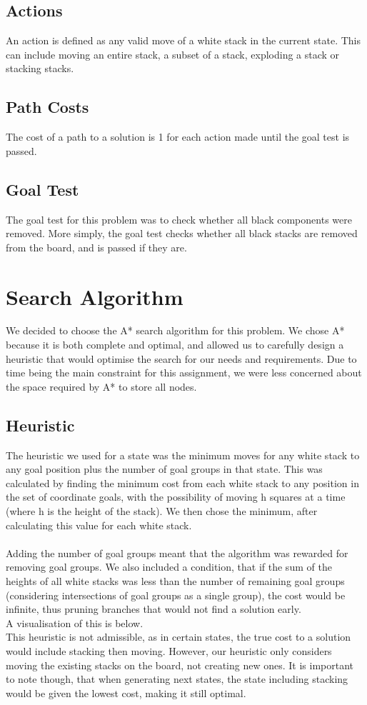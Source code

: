 \documentclass[11pt]{article}
\begin{document}
    \subsection{Actions}\label{subsec:actions}
    An action is defined as any valid move of a white stack in the current state.
    This can include moving an entire stack, a subset of a stack, exploding a stack or stacking stacks.
    \subsection{Path Costs}\label{subsec:path-costs}
    The cost of a path to a solution is 1 for each action made until the goal test is passed.
    \subsection{Goal Test}\label{subsec:goal-test}
    The goal test for this problem was to check whether all black components were removed.
    More simply, the goal test checks whether all black stacks are removed from the board, and is passed if they are.
    \section{Search Algorithm}\label{sec:search-algorithm}
    We decided to choose the A* search algorithm for this problem.
    We chose A* because it is both complete and optimal, and allowed us to carefully design a heuristic that would
    optimise the search for our needs and requirements.
    Due to time being the main constraint for this assignment, we were less concerned about the space
    required by A* to store all nodes.
    \subsection{Heuristic}\label{subsec:heuristic}
    The heuristic we used for a state was the minimum moves for any white stack to any goal position plus the number of
    goal groups in that state.
    This was calculated by finding the minimum cost from each white stack to any position in the set of coordinate
    goals, with the possibility of moving h squares at a time (where h is the height of the stack).
    We then chose the minimum, after calculating this value for each white stack.\\\\
    Adding the number of goal groups meant that the algorithm was rewarded for removing goal groups.
    We also included a condition, that if the sum of the heights of all white stacks was less than the number of
    remaining goal groups (considering intersections of goal groups as a single group), the cost would be infinite,
    thus pruning branches that would not find a solution early.\\
    A visualisation of this is below.\\
    This heuristic is not admissible, as in certain states, the true cost to a solution would include stacking then
    moving.
    However, our heuristic only considers moving the existing stacks on the board, not creating new ones.
    It is important to note though, that when generating next states, the state including stacking would be
    given the lowest cost, making it still optimal.
\end{document}
